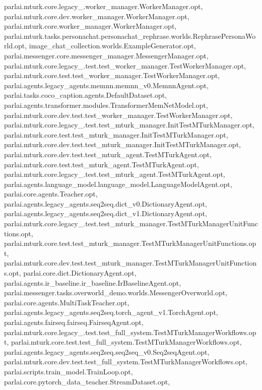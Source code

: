 parlai.\+mturk.\+core.\+legacy\+\_.\+worker\+\_\+manager.\+Worker\+Manager.\+opt, parlai.\+mturk.\+core.\+dev.\+worker\+\_\+manager.\+Worker\+Manager.\+opt, parlai.\+mturk.\+core.\+worker\+\_\+manager.\+Worker\+Manager.\+opt, parlai.\+mturk.\+tasks.\+personachat.\+personachat\+\_\+rephrase.\+worlds.\+Rephrase\+Persona\+World.\+opt, image\+\_\+chat\+\_\+collection.\+worlds.\+Example\+Generator.\+opt, parlai.\+messenger.\+core.\+messenger\+\_\+manager.\+Messenger\+Manager.\+opt, parlai.\+mturk.\+core.\+legacy\+\_.\+test.\+test\+\_\+worker\+\_\+manager.\+Test\+Worker\+Manager.\+opt, parlai.\+mturk.\+core.\+test.\+test\+\_\+worker\+\_\+manager.\+Test\+Worker\+Manager.\+opt, parlai.\+agents.\+legacy\+\_\+agents.\+memnn.\+memnn\+\_\+v0.\+Memnn\+Agent.\+opt, parlai.\+tasks.\+coco\+\_\+caption.\+agents.\+Default\+Dataset.\+opt, parlai.\+agents.\+transformer.\+modules.\+Transformer\+Mem\+Net\+Model.\+opt, parlai.\+mturk.\+core.\+dev.\+test.\+test\+\_\+worker\+\_\+manager.\+Test\+Worker\+Manager.\+opt, parlai.\+mturk.\+core.\+legacy\+\_.\+test.\+test\+\_\+mturk\+\_\+manager.\+Init\+Test\+M\+Turk\+Manager.\+opt, parlai.\+mturk.\+core.\+test.\+test\+\_\+mturk\+\_\+manager.\+Init\+Test\+M\+Turk\+Manager.\+opt, parlai.\+mturk.\+core.\+dev.\+test.\+test\+\_\+mturk\+\_\+manager.\+Init\+Test\+M\+Turk\+Manager.\+opt, parlai.\+mturk.\+core.\+dev.\+test.\+test\+\_\+mturk\+\_\+agent.\+Test\+M\+Turk\+Agent.\+opt, parlai.\+mturk.\+core.\+test.\+test\+\_\+mturk\+\_\+agent.\+Test\+M\+Turk\+Agent.\+opt, parlai.\+mturk.\+core.\+legacy\+\_.\+test.\+test\+\_\+mturk\+\_\+agent.\+Test\+M\+Turk\+Agent.\+opt, parlai.\+agents.\+language\+\_\+model.\+language\+\_\+model.\+Language\+Model\+Agent.\+opt, parlai.\+core.\+agents.\+Teacher.\+opt, parlai.\+agents.\+legacy\+\_\+agents.\+seq2seq.\+dict\+\_\+v0.\+Dictionary\+Agent.\+opt, parlai.\+agents.\+legacy\+\_\+agents.\+seq2seq.\+dict\+\_\+v1.\+Dictionary\+Agent.\+opt, parlai.\+mturk.\+core.\+legacy\+\_.\+test.\+test\+\_\+mturk\+\_\+manager.\+Test\+M\+Turk\+Manager\+Unit\+Functions.\+opt, parlai.\+mturk.\+core.\+test.\+test\+\_\+mturk\+\_\+manager.\+Test\+M\+Turk\+Manager\+Unit\+Functions.\+opt, parlai.\+mturk.\+core.\+dev.\+test.\+test\+\_\+mturk\+\_\+manager.\+Test\+M\+Turk\+Manager\+Unit\+Functions.\+opt, parlai.\+core.\+dict.\+Dictionary\+Agent.\+opt, parlai.\+agents.\+ir\+\_\+baseline.\+ir\+\_\+baseline.\+Ir\+Baseline\+Agent.\+opt, parlai.\+messenger.\+tasks.\+overworld\+\_\+demo.\+worlds.\+Messenger\+Overworld.\+opt, parlai.\+core.\+agents.\+Multi\+Task\+Teacher.\+opt, parlai.\+agents.\+legacy\+\_\+agents.\+seq2seq.\+torch\+\_\+agent\+\_\+v1.\+Torch\+Agent.\+opt, parlai.\+agents.\+fairseq.\+fairseq.\+Fairseq\+Agent.\+opt, parlai.\+mturk.\+core.\+legacy\+\_.\+test.\+test\+\_\+full\+\_\+system.\+Test\+M\+Turk\+Manager\+Workflows.\+opt, parlai.\+mturk.\+core.\+test.\+test\+\_\+full\+\_\+system.\+Test\+M\+Turk\+Manager\+Workflows.\+opt, parlai.\+agents.\+legacy\+\_\+agents.\+seq2seq.\+seq2seq\+\_\+v0.\+Seq2seq\+Agent.\+opt, parlai.\+mturk.\+core.\+dev.\+test.\+test\+\_\+full\+\_\+system.\+Test\+M\+Turk\+Manager\+Workflows.\+opt, parlai.\+scripts.\+train\+\_\+model.\+Train\+Loop.\+opt, parlai.\+core.\+pytorch\+\_\+data\+\_\+teacher.\+Stream\+Dataset.\+opt, 